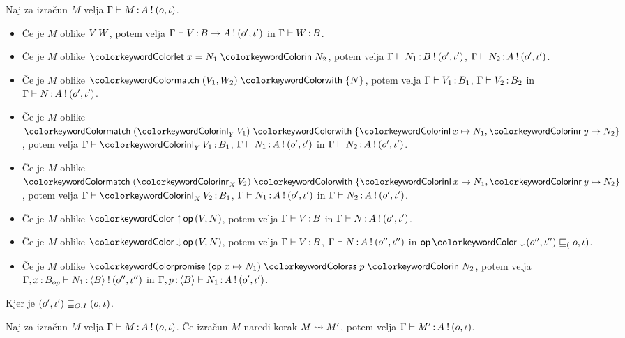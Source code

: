 \begin{lema}\label{lem:inversion-lema}
	Naj za izračun $M$ velja $\Gamma \vdash M \mathinner{:} A \mathbin{!} (o, \iota)$.
	\begin{itemize}
		\item Če je $M$ oblike $V\,W$, potem velja $\Gamma \vdash V \mathinner{:} B \to A \mathbin{!} (o', \iota')$ in $\Gamma \vdash W \mathinner{:} B$.
		
		\item Če je $M$ oblike $\tmlet{x}{N_1}{N_2}$, potem velja $\Gamma \vdash N_1 \mathinner{:} B \mathbin{!} (o', \iota')$, $\Gamma \vdash N_2 \mathinner{:} A \mathbin{!} (o', \iota')$.
	
		\item Če je $M$ oblike $\tmmatch{\tmpair{V_1}{W_2}}{N}$, potem velja $\Gamma \vdash V_1 \mathinner{:} B_1$, $\Gamma \vdash V_2 \mathinner{:} B_2$ in $\Gamma \vdash N \mathinner{:} A \mathbin{!} (o', \iota')$.
		
		\item Če je $M$ oblike $\tmmatch{(\tminl[Y]{V_1})}{\tminl{x} \mapsto N_1, \tminr{y} \mapsto N_2}$, potem velja $\Gamma \types \tminl[Y]{V_1} \of B_1$, $\Gamma \vdash N_1 \mathinner{:} A \mathbin{!} (o', \iota')$ in $\Gamma \vdash N_2 \mathinner{:} A \mathbin{!} (o', \iota')$.
		
		\item Če je $M$ oblike $\tmmatch{(\tminr[X]{V_2})}{\tminl{x} \mapsto N_1, \tminr{y} \mapsto N_2}$, potem velja $\Gamma \types \tminl[X]{V_2} \of B_1$, $\Gamma \vdash N_1 \mathinner{:} A \mathbin{!} (o', \iota')$ in $\Gamma \vdash N_2 \mathinner{:} A \mathbin{!} (o', \iota')$.
		
		\item Če je $M$ oblike $\tmopout{op}{V}{N}$, potem velja $\Gamma \vdash V \mathinner{:} B$ in $\Gamma \vdash N \mathinner{:} A \mathbin{!} (o', \iota')$.
		
		\item Če je $M$ oblike $\tmopin{op}{V}{N}$, potem velja $\Gamma \vdash V \mathinner{:} B$, $\Gamma \vdash N \mathinner{:} A \mathbin{!} (o'', \iota'')$ in $\opincomp{op}{(\o'', \i'')} \order (\o, \i)$.
		
		\item Če je $M$ oblike $\tmwith{op}{x}{N_1}{p}{N_2}$, potem velja $\Gamma, x \mathinner{:} B_{op} \vdash N_1 \mathinner{:} \langle B \rangle \mathbin{!} (o'', \iota'')$ in $\Gamma, p \mathinner{:} \langle B \rangle \vdash N_1 \mathinner{:} A \mathbin{!} (o', \iota')$.
		
	\end{itemize}
	Kjer je $(o', \iota') \sqsubseteq_{O, I} (o, \iota)$.
\end{lema}

\begin{trditev}[o ohranitvi]\label{trd:ohranitev-izracuni}
	Naj za izračun $M$ velja $\Gamma \vdash M \mathinner{:} A \mathbin{!} (o, \iota)$. Če izračun $M$ naredi korak $M \leadsto M'$, potem velja $\Gamma \vdash M' \mathinner{:} A \mathbin{!} (o, \iota)$.
\end{trditev}

